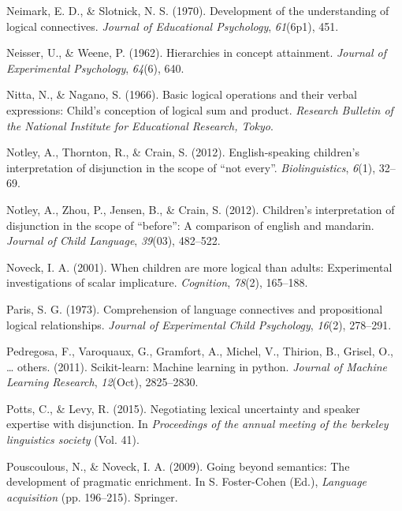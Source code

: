 \documentclass[oneside]{report}
\theoremstyle{definition}
\theoremstyle{definition}
\theoremstyle{definition}
\theoremstyle{remark}
\begin{document}
\hypertarget{ref-neimark1970development}{}
Neimark, E. D., \& Slotnick, N. S. (1970). Development of the
understanding of logical connectives. \emph{Journal of Educational
Psychology}, \emph{61}(6p1), 451.

\hypertarget{ref-neisser1962hierarchies}{}
Neisser, U., \& Weene, P. (1962). Hierarchies in concept attainment.
\emph{Journal of Experimental Psychology}, \emph{64}(6), 640.

\hypertarget{ref-nitta1966basic}{}
Nitta, N., \& Nagano, S. (1966). Basic logical operations and their
verbal expressions: Child's conception of logical sum and product.
\emph{Research Bulletin of the National Institute for Educational
Research, Tokyo}.

\hypertarget{ref-notley2012notevery}{}
Notley, A., Thornton, R., \& Crain, S. (2012). English-speaking
children's interpretation of disjunction in the scope of ``not every''.
\emph{Biolinguistics}, \emph{6}(1), 32--69.

\hypertarget{ref-notley2012children}{}
Notley, A., Zhou, P., Jensen, B., \& Crain, S. (2012). Children's
interpretation of disjunction in the scope of ``before'': A comparison
of english and mandarin. \emph{Journal of Child Language},
\emph{39}(03), 482--522.

\hypertarget{ref-noveck2001children}{}
Noveck, I. A. (2001). When children are more logical than adults:
Experimental investigations of scalar implicature. \emph{Cognition},
\emph{78}(2), 165--188.

\hypertarget{ref-paris1973comprehension}{}
Paris, S. G. (1973). Comprehension of language connectives and
propositional logical relationships. \emph{Journal of Experimental Child
Psychology}, \emph{16}(2), 278--291.

\hypertarget{ref-pedregosa2011scikit}{}
Pedregosa, F., Varoquaux, G., Gramfort, A., Michel, V., Thirion, B.,
Grisel, O., \ldots{} others. (2011). Scikit-learn: Machine learning in
python. \emph{Journal of Machine Learning Research}, \emph{12}(Oct),
2825--2830.

\hypertarget{ref-potts2015negotiating}{}
Potts, C., \& Levy, R. (2015). Negotiating lexical uncertainty and
speaker expertise with disjunction. In \emph{Proceedings of the annual
meeting of the berkeley linguistics society} (Vol. 41).

\hypertarget{ref-pouscoulous2009going}{}
Pouscoulous, N., \& Noveck, I. A. (2009). Going beyond semantics: The
development of pragmatic enrichment. In S. Foster-Cohen (Ed.),
\emph{Language acquisition} (pp. 196--215). Springer.
\end{document}
